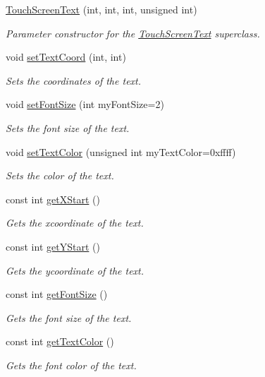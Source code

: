 \begin{DoxyCompactItemize}
\item 
\hyperlink{class_touch_screen_text_a4603c93a9419c4a7ab81b24d7a925a7b}{Touch\+Screen\+Text} (int, int, int, unsigned int)
\begin{DoxyCompactList}\small\item\em Parameter constructor for the \hyperlink{class_touch_screen_text}{Touch\+Screen\+Text} superclass. \end{DoxyCompactList}\item 
void \hyperlink{class_touch_screen_text_ad93fb5b78ee2578fe3730210ba172ee7}{set\+Text\+Coord} (int, int)
\begin{DoxyCompactList}\small\item\em Sets the coordinates of the text. \end{DoxyCompactList}\item 
void \hyperlink{class_touch_screen_text_ab276b0e4f90739d052e521d0e2fe5cc2}{set\+Font\+Size} (int my\+Font\+Size=2)
\begin{DoxyCompactList}\small\item\em Sets the font size of the text. \end{DoxyCompactList}\item 
void \hyperlink{class_touch_screen_text_a5a1bbd3e035ec114da0a341dad341461}{set\+Text\+Color} (unsigned int my\+Text\+Color=0xffff)
\begin{DoxyCompactList}\small\item\em Sets the color of the text. \end{DoxyCompactList}\item 
const int \hyperlink{class_touch_screen_text_ad4bf2d307ed2c96eed40969cdbdf4bcc}{get\+X\+Start} ()
\begin{DoxyCompactList}\small\item\em Gets the xcoordinate of the text. \end{DoxyCompactList}\item 
const int \hyperlink{class_touch_screen_text_a50372422c5ddb6c9b9f689a1e95e92ae}{get\+Y\+Start} ()
\begin{DoxyCompactList}\small\item\em Gets the ycoordinate of the text. \end{DoxyCompactList}\item 
const int \hyperlink{class_touch_screen_text_a34115eeb243b200e8546d7b203e8be54}{get\+Font\+Size} ()
\begin{DoxyCompactList}\small\item\em Gets the font size of the text. \end{DoxyCompactList}\item 
const int \hyperlink{class_touch_screen_text_ab1ba5d5526f00d925e5b0239901b7d50}{get\+Text\+Color} ()
\begin{DoxyCompactList}\small\item\em Gets the font color of the text. \end{DoxyCompactList}\end{DoxyCompactItemize}

